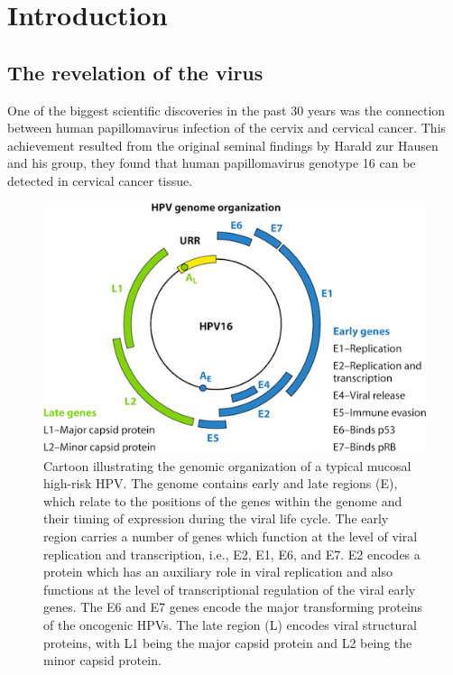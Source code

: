 
\chapter{Introduction}\label{intro}

\section{The revelation of the virus}
One of the biggest scientific discoveries in the past 30 years was the connection between human papillomavirus infection of the cervix and cervical cancer. This achievement resulted from the original seminal findings by Harald zur Hausen and his group, they found that human papillomavirus genotype 16 can be detected in cervical cancer tissue. 
\begin{figure}[ht]
	\centering
	\includegraphics[scale=0.7]{IMG/genoma.png}
	\caption{Cartoon illustrating the genomic organization of a typical mucosal high-risk HPV. The genome contains early and late regions (E), which relate to the positions of the genes within the genome and their timing of expression during the viral life cycle. The early region carries a number of genes which function at the level of viral replication and transcription, i.e., E2, E1, E6, and E7. E2 encodes a protein which has an auxiliary role in viral replication and also functions at the level of transcriptional regulation of the viral early genes. The E6 and E7 genes encode the major transforming proteins of the oncogenic HPVs. The late region (L) encodes viral structural proteins, with L1 being the major capsid protein and L2 being the minor capsid protein.}
	\label{genoma}
\end{figure}

